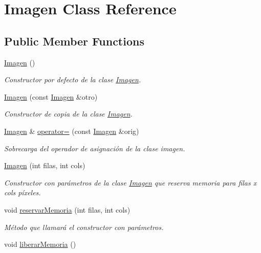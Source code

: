\hypertarget{classImagen}{}\section{Imagen Class Reference}
\label{classImagen}
\subsection*{Public Member Functions}
\begin{DoxyCompactItemize}
\item 
\hyperlink{classImagen_ab2e649aa7a105155c7bfdb846abf0528}{Imagen} ()
\begin{DoxyCompactList}\small\item\em Constructor por defecto de la clase \hyperlink{classImagen}{Imagen}. \end{DoxyCompactList}\item 
\hyperlink{classImagen_a46f9fbbfd928f81c2f37947cde05d73c}{Imagen} (const \hyperlink{classImagen}{Imagen} \&otro)
\begin{DoxyCompactList}\small\item\em Constructor de copia de la clase \hyperlink{classImagen}{Imagen}. \end{DoxyCompactList}\item 
\hyperlink{classImagen}{Imagen} \& \hyperlink{classImagen_a9cfdf5f496d78247026783b4026458e8}{operator=} (const \hyperlink{classImagen}{Imagen} \&orig)
\begin{DoxyCompactList}\small\item\em Sobrecarga del operador de asignación de la clase imagen. \end{DoxyCompactList}\item 
\hyperlink{classImagen_ad4943ff0e2de31d4c25a879030f3ebf2}{Imagen} (int filas, int cols)
\begin{DoxyCompactList}\small\item\em Constructor con parámetros de la clase \hyperlink{classImagen}{Imagen} que reserva memoria para filas x cols píxeles. \end{DoxyCompactList}\item 
void \hyperlink{classImagen_a37461202648dcc0544547e6d19b19db0}{reservar\+Memoria} (int filas, int cols)
\begin{DoxyCompactList}\small\item\em Método que llamará el constructor con parámetros. \end{DoxyCompactList}\item 
void \hyperlink{classImagen_a139a1df7a2855af7d0a9cf406902af4a}{liberar\+Memoria} ()

\end{DoxyCompactItemize}
